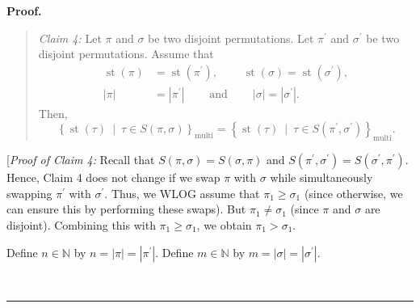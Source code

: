 \documentclass[numbers=enddot,12pt,final,onecolumn,notitlepage]{scrartcl}%
\theoremstyle{definition}
\newenvironment{statement}{\begin{quote}}{\end{quote}}
\newenvironment{proof}[1][Proof]{\noindent\textbf{#1.} }{\ \rule{0.5em}{0.5em}}
\begin{document}
\begin{proof}
\begin{statement}
\textit{Claim 4:} Let $\pi$ and $\sigma$ be two disjoint permutations. Let
$\pi^{\prime}$ and $\sigma^{\prime}$ be two disjoint permutations. Assume that%
\begin{align*}
\operatorname*{st}\left(  \pi\right)   &  =\operatorname*{st}\left(
\pi^{\prime}\right)  ,\ \ \ \ \ \ \ \ \ \ \operatorname*{st}\left(
\sigma\right)  =\operatorname*{st}\left(  \sigma^{\prime}\right)  ,\\
\left\vert \pi\right\vert  &  =\left\vert \pi^{\prime}\right\vert
\ \ \ \ \ \ \ \ \ \ \text{and}\ \ \ \ \ \ \ \ \ \ \left\vert \sigma\right\vert
=\left\vert \sigma^{\prime}\right\vert .
\end{align*}
Then,
\[
\left\{  \operatorname*{st}\left(  \tau\right)  \ \mid\ \tau\in S\left(
\pi,\sigma\right)  \right\}  _{\operatorname*{multi}}=\left\{
\operatorname*{st}\left(  \tau\right)  \ \mid\ \tau\in S\left(  \pi^{\prime
},\sigma^{\prime}\right)  \right\}  _{\operatorname*{multi}}.
\]

\end{statement}

[\textit{Proof of Claim 4:} Recall that $S\left(  \pi,\sigma\right)  =S\left(
\sigma,\pi\right)  $ and $S\left(  \pi^{\prime},\sigma^{\prime}\right)
=S\left(  \sigma^{\prime},\pi^{\prime}\right)  $. Hence, Claim 4 does not
change if we swap $\pi$ with $\sigma$ while simultaneously swapping
$\pi^{\prime}$ with $\sigma^{\prime}$. Thus, we WLOG assume that $\pi_{1}%
\geq\sigma_{1}$ (since otherwise, we can ensure this by performing these
swaps). But $\pi_{1}\neq\sigma_{1}$ (since $\pi$ and $\sigma$ are disjoint).
Combining this with $\pi_{1}\geq\sigma_{1}$, we obtain $\pi_{1}>\sigma_{1}$.

Define $n\in\mathbb{N}$ by $n=\left\vert \pi\right\vert =\left\vert
\pi^{\prime}\right\vert $. Define $m\in\mathbb{N}$ by $m=\left\vert
\sigma\right\vert =\left\vert \sigma^{\prime}\right\vert $.


\end{proof}
\end{document}
